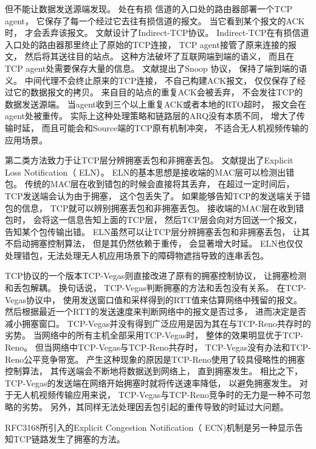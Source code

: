但不能让数据发送源端发现。
处在有损 信道的入口处的路由器部署一个TCP agent，
它保存了每一个经过它去往有损信道的报文。
当它看到某个报文的ACK时，
才会丢弃该报文。
文献\cite{Bakre1995I}设计了Indirect-TCP协议。
Indirect-TCP在有损信道入口处的路由器那里终止了原始的TCP连接，
TCP agent接管了原来连接的报文，
然后将其送往目的站点。
这种方法破坏了互联网端到端的语义，
而且在TCP agent处需要保存大量的信息。
文献\cite{Balakrishnan1995Improving}提出了Snoop 协议，
保持了端到端的语义。
中间代理不会终止原来的TCP连接，
不自己构建ACK报文，
仅仅保存了经过它的数据报文的拷贝。
来自目的站点的重复ACK会被丢弃，
不会发往TCP的数据发送源端。
当agent收到三个以上重复ACK或者本地的RTO超时，
报文会在agent处被重传。
实际上这种处理策略和链路层的ARQ没有本质不同，
增大了传输时延，
而且可能会和Source端的TCP原有机制冲突，
不适合无人机视频传输的应用场景。
\par
第二类方法致力于让TCP层分辨拥塞丢包和非拥塞丢包。
文献\cite{buchholcz2003explicit}提出了Explicit Loss Notification（ ELN）。
ELN的基本思想是接收端的MAC层可以检测出错包。
传统的MAC层在收到错包的时候会直接将其丢弃，
在超过一定时间后，
TCP发送端会认为由于拥塞，
这个包丢失了。
如果能够告知TCP的发送端关于错包的信息，
TCP就可以辨别拥塞丢包和非拥塞丢包。
接收端的MAC层在收到错包时，
会将这一信息告知上面的TCP层，
然后TCP层会向对方回送一个报文，
告知某个包传输出错。
ELN虽然可以让TCP层分辨拥塞丢包和非拥塞丢包，
让其不启动拥塞控制算法，
但是其仍然依赖于重传，
会显著增大时延。
ELN也仅仅处理错包，无法处理无人机应用场景下的障碍物遮挡导致的连串丢包。
\par
TCP协议的一个版本TCP-Vegas\textsuperscript{\cite{brakmo1995tcp}}则直接改进了原有的拥塞控制协议，
让拥塞检测和丢包解耦。
换句话说，
TCP-Vegas判断拥塞的方法和丢包没有关系。
在TCP-Vegas协议中，
使用发送窗口值和采样得到的RTT值来估算网络中残留的报文。
然后根据最近一个RTT的发送速度来判断网络中的报文是否过多，
进而决定是否减小拥塞窗口。
TCP-Vegas并没有得到广泛应用是因为其在与TCP-Reno共存时的劣势。
当网络中的所有主机全部采用TCP-Vegas时，
整体的效果明显优于TCP-Reno。
但当网络中TCP-Vegas与TCP-Reno共存时，
TCP-Vegas没有办法和TCP-Reno公平竞争带宽。
产生这种现象的原因是TCP-Reno使用了较具侵略性的拥塞控制算法，
其传送端会不断地将数据送到网络上，
直到拥塞发生。
相比之下，
TCP-Vegas的发送端在网络开始拥塞时就将传送速率降低，
以避免拥塞发生。
对于无人机视频传输应用来说，
TCP-Vegas与TCP-Reno竞争时的无力是一种不可忽略的劣势。
另外，其同样无法处理因丢包引起的重传导致的时延过大问题。
\par
RFC3168所引入的Explicit Congestion Notification（ ECN)机制\textsuperscript{\cite{ramakrishnan2001rfc}}是另一种显示告知TCP链路发生了拥塞的方法。
